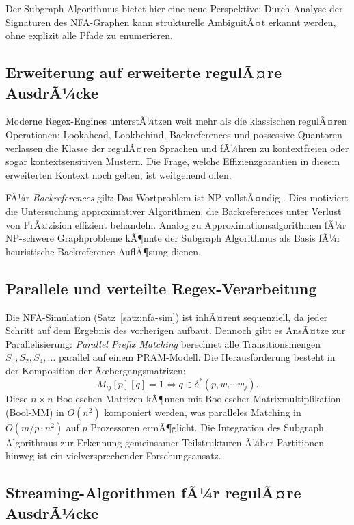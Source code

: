 ﻿\documentclass[a4paper,12pt]{article}
\theoremstyle{definition}
\begin{document}
Der Subgraph Algorithmus bietet hier eine neue Perspektive: Durch Analyse der
Signaturen des NFA-Graphen kann strukturelle AmbiguitÃ¤t erkannt werden, ohne
explizit alle Pfade zu enumerieren.

\subsection{Erweiterung auf erweiterte regulÃ¤re AusdrÃ¼cke}

Moderne Regex-Engines unterstÃ¼tzen weit mehr als die klassischen regulÃ¤ren
Operationen: Lookahead, Lookbehind, Backreferences und possessive Quantoren
verlassen die Klasse der regulÃ¤ren Sprachen und fÃ¼hren zu kontextfreien oder
sogar kontextsensitiven Mustern. Die Frage, welche Effizienzgarantien in diesem
erweiterten Kontext noch gelten, ist weitgehend offen.

FÃ¼r \emph{Backreferences} gilt: Das Wortproblem ist NP-vollstÃ¤ndig \cite{aho1990}.
Dies motiviert die Untersuchung approximativer Algorithmen, die Backreferences
unter Verlust von PrÃ¤zision effizient behandeln. Analog zu Approximationsalgorithmen
fÃ¼r NP-schwere Graphprobleme kÃ¶nnte der Subgraph Algorithmus als
Basis fÃ¼r heuristische Backreference-AuflÃ¶sung dienen.

\subsection{Parallele und verteilte Regex-Verarbeitung}

Die NFA-Simulation (Satz~\ref{satz:nfa-sim}) ist inhÃ¤rent sequenziell, da jeder
Schritt auf dem Ergebnis des vorherigen aufbaut. Dennoch gibt es AnsÃ¤tze zur
Parallelisierung: \emph{Parallel Prefix Matching} berechnet alle
Transitionsmengen $S_0, S_2, S_4, \ldots$ parallel auf einem PRAM-Modell.
Die Herausforderung besteht in der Komposition der Ãœbergangsmatrizen:
\[
	M_{ij}[p][q] = 1 \Leftrightarrow q \in \delta^*(p, w_i \cdots w_j).
\]
Diese $n \times n$ Booleschen Matrizen kÃ¶nnen mit Boolescher Matrixmultiplikation
(Bool-MM) in $O(n^2)$ komponiert werden, was paralleles Matching in
$O(m/p \cdot n^2)$ auf $p$ Prozessoren ermÃ¶glicht. Die Integration des
Subgraph Algorithmus zur Erkennung gemeinsamer Teilstrukturen Ã¼ber Partitionen
hinweg ist ein vielversprechender Forschungsansatz.

\subsection{Streaming-Algorithmen fÃ¼r regulÃ¤re AusdrÃ¼cke}
\end{document}
